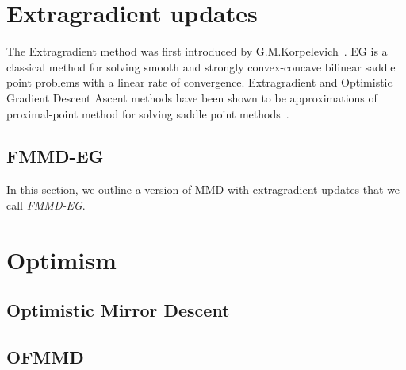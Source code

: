 \section{Extragradient updates}

The Extragradient method was first introduced by G.M.Korpelevich~\cite{korpelevichEG1976}.
EG is a classical method for solving smooth and strongly convex-concave bilinear saddle point
problems with a linear rate of convergence.
Extragradient and Optimistic Gradient Descent Ascent methods have been shown to be approximations
of proximal-point method for solving saddle point methods~\cite{mokhtariUnified2020}.

\subsection{FMMD-EG}
In this section, we outline a version of MMD with extragradient updates that we call
\textit{FMMD-EG}.

\section{Optimism}

\subsection{Optimistic Mirror Descent}

\subsection{OFMMD}